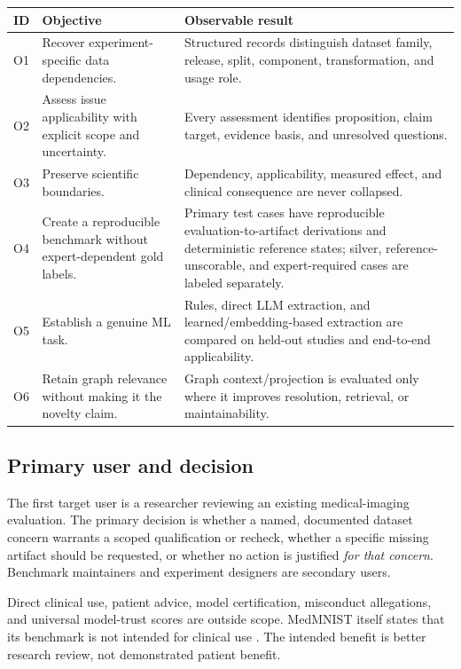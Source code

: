 \documentclass[11pt,a4paper]{article}
\begin{document}
\begin{tabularx}{\linewidth}{@{}L{13mm}Y Y@{}}
\toprule
\textbf{ID} & \textbf{Objective} & \textbf{Observable result}\\ \midrule
O1 & Recover experiment-specific data dependencies. & Structured records distinguish dataset family, release, split, component, transformation, and usage role.\\
O2 & Assess issue applicability with explicit scope and uncertainty. & Every assessment identifies proposition, claim target, evidence basis, and unresolved questions.\\
O3 & Preserve scientific boundaries. & Dependency, applicability, measured effect, and clinical consequence are never collapsed.\\
O4 & Create a reproducible benchmark without expert-dependent gold labels. & Primary test cases have reproducible evaluation-to-artifact derivations and deterministic reference states; silver, reference-unscorable, and expert-required cases are labeled separately.\\
O5 & Establish a genuine ML task. & Rules, direct LLM extraction, and learned/embedding-based extraction are compared on held-out studies and end-to-end applicability.\\
O6 & Retain graph relevance without making it the novelty claim. & Graph context/projection is evaluated only where it improves resolution, retrieval, or maintainability.\\
\bottomrule
\end{tabularx}

\subsection{Primary user and decision}
The first target user is a researcher reviewing an existing medical-imaging evaluation. The primary decision is whether a named, documented dataset concern warrants a scoped qualification or recheck, whether a specific missing artifact should be requested, or whether no action is justified \emph{for that concern}. Benchmark maintainers and experiment designers are secondary users.

Direct clinical use, patient advice, model certification, misconduct allegations, and universal model-trust scores are outside scope. MedMNIST itself states that its benchmark is not intended for clinical use \cite{medmnist}. The intended benefit is better research review, not demonstrated patient benefit.
\end{document}
